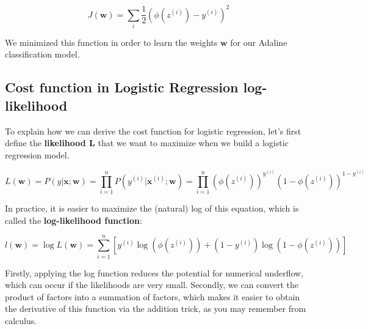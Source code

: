\documentclass[11pt]{article}
\newcommand{\vect}[1]{\boldsymbol{#1}}
\begin{document}
    \begin{equation}
        \label{eq:cost_sse}
        J(\boldsymbol{w}) = \sum \limits_i \frac{1} {2} \left( \phi \left( z^{(i)} \right) - y^{(i)} \right) ^2
    \end{equation}

    We minimized this function in order to learn the weights $\vect{w}$ for our Adaline classification model.

    \subsection{Cost function in Logistic Regression \textemdash log-likelihood} \label{subsec:lr_cost}

    To explain how we can derive the cost function for logistic regression, let's first define the \textbf{likelihood L} that we want to maximize when we build a logistic regression model.

    \begin{equation}
        \label{eq:lr_like}
        L(\vect{w}) = P(y|\vect{x};\vect{w}) =
        \prod \limits_{i=1}^n P \left( y^{(i)} | \vect{x}^{(i)}; \vect{w}\right) =
        \prod \limits_{i=1}^{n} \left( \phi \left( z^{(i)} \right) \right)^{y^{(i)}} \left( 1 - \phi \left( z^{(i)} \right) \right)^{1 - y^{(i)}}
    \end{equation}

    In practice, it is easier to maximize the (natural) log of this equation, which is called the \textbf{log-likelihood function}:

    \begin{equation}
        \label{eq:lr_log_like}
        l(\vect{w}) =
        \log L( \vect{w} ) =
        \sum \limits_{i=1}^n \left[ y^{(i)} \log \left( \phi \left( z^{(i)} \right) \right) + \left( 1 - y^{(i)} \right) \log \left( 1 - \phi \left( z^{(i)} \right) \right) \right]
    \end{equation}

    Firstly, applying the log function reduces the potential for numerical underflow, which can occur if the likelihoods are very small.
    Secondly, we can convert the product of factors into a summation of factors, which makes it easier to obtain the derivative of this function via the addition trick, as you may remember from calculus.
\end{document}
